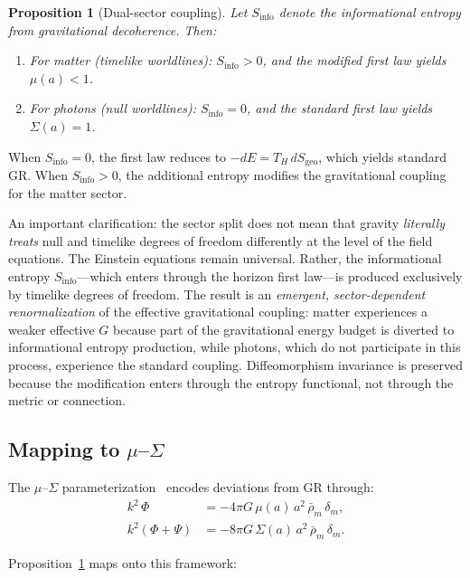 \documentclass[11pt]{article}
\newtheorem{proposition}{Proposition}
\begin{document}
\begin{proposition}[Dual-sector coupling]
\label{prop:dual_sector}
Let $S_\mathrm{info}$ denote the informational entropy from gravitational
decoherence.  Then:
\begin{enumerate}
\item For matter (timelike worldlines): $S_\mathrm{info} > 0$, and the
  modified first law yields $\mu(a) < 1$.
\item For photons (null worldlines): $S_\mathrm{info} = 0$, and the
  standard first law yields $\Sigma(a) = 1$.
\end{enumerate}
\end{proposition}

When $S_\mathrm{info} = 0$, the first law reduces to
$-dE = T_H\,dS_\mathrm{geo}$, which yields standard GR.  When
$S_\mathrm{info} > 0$, the additional entropy modifies the gravitational
coupling for the matter sector.

An important clarification: the sector split does not mean that gravity
\emph{literally treats} null and timelike degrees of freedom differently at
the level of the field equations.  The Einstein equations remain universal.
Rather, the informational entropy $S_\mathrm{info}$---which enters through
the horizon first law---is produced exclusively by timelike degrees of
freedom.  The result is an \emph{emergent, sector-dependent renormalization}
of the effective gravitational coupling: matter experiences a weaker
effective $G$ because part of the gravitational energy budget is diverted to
informational entropy production, while photons, which do not participate in
this process, experience the standard coupling.  Diffeomorphism invariance is
preserved because the modification enters through the entropy functional, not
through the metric or connection.

\subsection{Mapping to $\mu$--$\Sigma$}

The $\mu$--$\Sigma$ parameterization~\citep{PogosianSilvestri2016} encodes
deviations from GR through:
\begin{align}
k^2\,\Phi &= -4\pi G\,\mu(a)\,a^2\,\bar{\rho}_m\,\delta_m,
  \label{eq:poisson_mu}\\
k^2(\Phi + \Psi) &= -8\pi G\,\Sigma(a)\,a^2\,\bar{\rho}_m\,\delta_m.
  \label{eq:poisson_sigma}
\end{align}

Proposition~\ref{prop:dual_sector} maps onto this framework:
\end{document}
